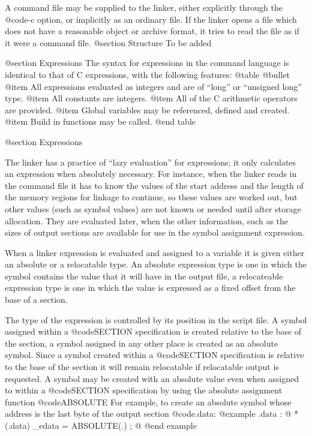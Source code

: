 A command file may be supplied to the linker, either explicitly through the
@code{-c} option, or implicitly as an ordinary file. If the linker opens
a file which does not have a reasonable object or archive format, it tries
to read the file as if it were a command file.
@section Structure
To be added

@section Expressions
The syntax for expressions in the command language is identical to that of
C expressions, with the following features:
@table @bullet
@item All expressions evaluated as integers and
are of ``long'' or ``unsigned long'' type.
@item All constants are integers.
@item All of the C arithmetic operators are provided.
@item Global variables may be referenced, defined and created.
@item Build in functions may be called.
@end table

@section Expressions

The linker has a practice of ``lazy evaluation'' for expressions; it only
calculates an expression when absolutely necessary. For instance, 
when the linker reads in the command file it has to know the values
of the start address and the length of the memory regions for linkage to continue, so these
values are worked out, but other values (such as symbol values) are not
known or needed until after storage allocation.
They are evaluated later, when the other
information, such as the sizes of output sections are available for use in
the symbol assignment expression.

When a linker expression is evaluated and assigned to a variable it is given
either an absolute or a relocatable type. An absolute expression type
is one in which the symbol contains the value that it will have in the
output file, a relocateable expression type is one in which the value
is expressed as a fixed offset from the base of a section.

The type of the expression is controlled by its position in the script
file. A symbol assigned within a @code{SECTION} specification is
created relative to the base of the section, a symbol assigned in any
other place is created as an absolute symbol. Since a symbol created
within a @code{SECTION} specification is relative to the base of the
section it will remain relocatable if relocatable output is requested.
A symbol may be created with an absolute value even when assigned to
within a @code{SECTION} specification by using the absolute assignment
function @code{ABSOLUTE} For example, to create an absolute symbol
whose address is the last byte of the output section @code{.data}:
@example
.data : 
        @{
                *(.data)
                _edata = ABSOLUTE(.) ;
        @} 
@end example

